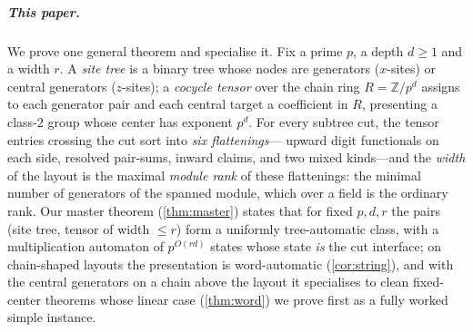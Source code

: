 \documentclass[a4paper,UKenglish,autoref,anonymous]{lipics-v2021}
\newcommand{\ZZ}{\mathbb{Z}}
\newcommand{\R}{R}                                   %
\begin{document}
\subparagraph*{This paper.}
We prove one general theorem and specialise it. Fix a prime $p$, a depth
$d \ge 1$ and a width $r$. A \emph{site tree} is a binary tree whose nodes
are generators ($x$-sites) or central generators ($z$-sites); a
\emph{cocycle tensor} over the chain ring $\R = \ZZ/p^d$ assigns to each
generator pair and each central target a coefficient in $\R$, presenting a
class-$2$ group whose center has exponent $p^d$. For every subtree cut,
the tensor entries crossing the cut sort into \emph{six flattenings}---
upward digit functionals on each side, resolved pair-sums, inward claims,
and two mixed kinds---and the \emph{width} of the layout is the maximal
\emph{module rank} of these flattenings: the minimal number of
generators of the spanned module, which over a field is the ordinary
rank.
Our master theorem (\autoref{thm:master}) states that for fixed $p, d, r$
the pairs (site tree, tensor of width $\le r$) form a uniformly
tree-automatic class, with a multiplication automaton of $p^{O(rd)}$
states whose state \emph{is} the cut interface; on chain-shaped layouts
the presentation is word-automatic (\autoref{cor:string}), and with the
central generators on a chain above the layout it specialises to clean
fixed-center theorems whose linear case (\autoref{thm:word}) we prove
first as a fully worked simple instance.
\end{document}
